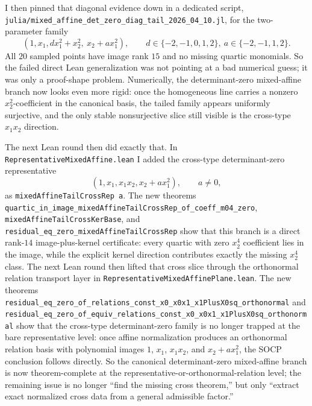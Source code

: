 \documentclass[11pt]{article}
\begin{document}
I then pinned that diagonal evidence down in a dedicated script,
\texttt{julia/mixed\_affine\_det\_zero\_diag\_tail\_2026\_04\_10.jl}, for the
two-parameter family
\[
  (1,x_1,d x_1^2 + x_2^2,\ x_2 + a x_1^2),
  \qquad
  d \in \{-2,-1,0,1,2\},\ 
  a \in \{-2,-1,1,2\}.
\]
All \(20\) sampled points have image rank \(15\) and no missing quartic
monomials. So the failed direct Lean generalization was not pointing at a bad
numerical guess; it was only a proof-shape problem. Numerically, the
determinant-zero mixed-affine branch now looks even more rigid: once the
homogeneous line carries a nonzero \(x_2^2\)-coefficient in the canonical
basis, the tailed family appears uniformly surjective, and the only stable
nonsurjective slice still visible is the cross-type \(x_1 x_2\) direction.

The next Lean round then did exactly that. In
\texttt{RepresentativeMixedAffine.lean} I added the cross-type determinant-zero
representative
\[
  (1,x_1,x_1x_2,x_2 + a x_1^2), \qquad a \neq 0,
\]
as \texttt{mixedAffineTailCrossRep a}. The new theorems
\texttt{quartic\_in\_image\_mixedAffineTailCrossRep\_of\_coeff\_m04\_zero},
\texttt{mixedAffineTailCrossKerBase}, and
\texttt{residual\_eq\_zero\_mixedAffineTailCrossRep}
show that this branch is a direct rank-\(14\) image-plus-kernel certificate:
every quartic with zero \(x_2^4\) coefficient lies in the image, while the
explicit kernel direction contributes exactly the missing \(x_2^4\) class.
The next Lean round then lifted that cross slice through the orthonormal
relation transport layer in \texttt{RepresentativeMixedAffinePlane.lean}. The
new theorems
\texttt{residual\_eq\_zero\_of\_relations\_const\_x0\_x0x1\_x1PlusX0sq\_orthonormal}
and
\texttt{residual\_eq\_zero\_of\_equiv\_relations\_const\_x0\_x0x1\_x1PlusX0sq\_orthonormal}
show that the cross-type determinant-zero family is no longer trapped at the
bare representative level: once affine normalization produces an orthonormal
relation basis with polynomial images \(1\), \(x_1\), \(x_1x_2\), and
\(x_2 + a x_1^2\), the SOCP conclusion follows directly. So the canonical
determinant-zero mixed-affine branch is now theorem-complete at the
representative-or-orthonormal-relation level; the remaining issue is no longer
``find the missing cross theorem,'' but only ``extract exact normalized cross
data from a general admissible factor.''
\end{document}

